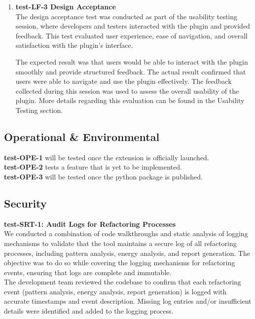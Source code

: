 \documentclass[12pt, titlepage]{article}
\begin{document}
\begin{enumerate}
  \item \textbf{test-LF-3 Design Acceptance} \\[2mm]
    The design acceptance test was conducted as part of the usability
    testing session, where developers and testers interacted with the
    plugin and provided feedback. This test evaluated user
    experience, ease of navigation, and overall satisfaction with the
    plugin's interface.

    The expected result was that users would be able to interact with
    the plugin smoothly and provide structured feedback. The actual
    result confirmed that users were able to navigate and use the
    plugin effectively. The feedback collected during this session
    was used to assess the overall usability of the plugin. More
    details regarding this evaluation can be found in the Usability
    Testing section.

\end{enumerate}

\subsection{Operational \& Environmental}

\textbf{test-OPE-1} will be tested once the extension is officially
launched.\\[2mm]

\noindent
\textbf{test-OPE-2} tests a feature that is yet to be implemented. \\[2mm]

\noindent
\textbf{test-OPE-3} will be tested once the python package is published.

\subsection{Security}

\textbf{test-SRT-1: Audit Logs for Refactoring Processes} \\[2mm]
We conducted a combination of code walkthroughs and static analysis
of logging mechanisms to validate that the tool maintains a secure
log of all refactoring processes, including pattern analysis, energy
analysis, and report generation. The objective was to do so while
covering the logging mechanisms for refactoring events, ensuring that
logs are complete and immutable.\\

\noindent The development team reviewed the codebase to confirm that
each refactoring event (pattern analysis, energy analysis, report
generation) is logged with accurate timestamps and event description.
Missing log entries and/or insufficient details were identified and
added to the logging process.\\
\end{document}
